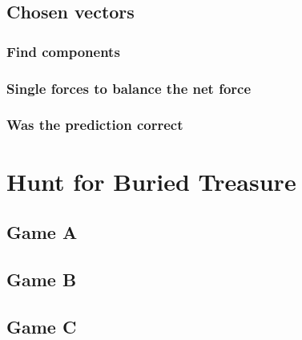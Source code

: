\documentclass[11pt, letterpaper, includehead]{article}
\begin{document}
\subsection{Chosen vectors} %

\subsubsection{Find components} %

\subsubsection{Single forces to balance the net force} %

\subsubsection{Was the prediction correct} %

\section{Hunt for Buried Treasure} %
\subsection{Game A} %
\subsection{Game B} %
\subsection{Game C} %
\end{document}
